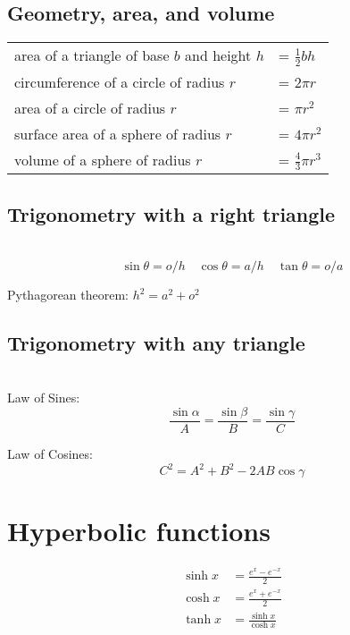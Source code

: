 \subsection{Geometry, area, and volume}

\noindent\begin{tabular}{p{100mm}l} %
  area of a triangle of base $b$ and height $h$     & = $\frac{1}{2}bh$ \\
  circumference of a circle of radius $r$           &= $2\pi r$ \\
  area of a circle of radius $r$                    &= $\pi r^2$ \\
  surface area of a sphere of radius $r$            &= $4\pi r^2$ \\
  volume of a sphere of radius $r$                  &= $\frac{4}{3}\pi r^3$
\end{tabular}

\subsection{Trigonometry with a right triangle}

\noindent{}\\
  \begin{equation*}
 \sin\theta  = o/h \quad
 \cos\theta = a/h \quad
 \tan\theta = o/a
 \end{equation*}

Pythagorean theorem: $h^2=a^2+o^2$

\subsection{Trigonometry with any triangle}

\\
Law of Sines:
  \begin{equation*} \frac{\sin\alpha}{A}=\frac{\sin\beta}{B}=\frac{\sin\gamma}{C} \end{equation*}

\noindent Law of Cosines:
  \begin{equation*} C^2 = A^2 + B^2 - 2AB \cos \gamma \end{equation*}

{}
\setcounter{section}{2}
\section*{Hyperbolic functions}
\begin{align*}
  \sinh x &= \frac{e^x-e^{-x}}{2} \\
  \cosh x &= \frac{e^x+e^{-x}}{2} \\
  \tanh x &= \frac{\sinh x}{\cosh x}
\end{align*}


